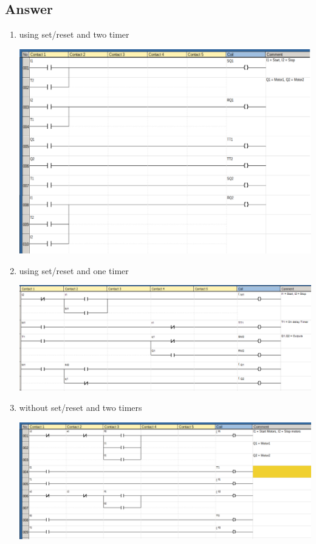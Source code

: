 \documentclass[
	12pt, %
]{fphw}
\begin{document}
 \subsection*{Answer}
  \begin{enumerate}
   \item using set/reset and two timer  
     \begin{center}
       \includegraphics[width=150mm, scale=0.80]{prg15.png}
     \end{center}
   \item using set/reset and one timer
 \begin{center}
   \includegraphics[width=150mm, scale=0.80]{p13b.png}
 \end{center}
   \item without set/reset and two timers
     \begin{center}
       \includegraphics[width=150mm, scale=0.80]{prg16.png}

\end{center}
\end{enumerate}
\end{document}
